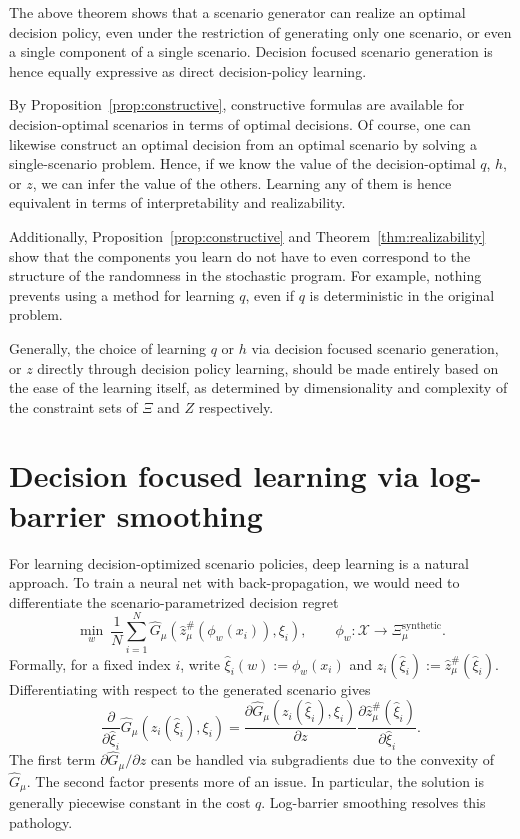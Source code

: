 \documentclass{article}
\newcommand{\1}{\mathbf{1}}
\theoremstyle{plain}
\theoremstyle{definition}
\theoremstyle{remark}
\begin{document}
The above theorem shows that a scenario generator can realize an optimal decision policy, even under the restriction of generating only one scenario, or even a single component of a single scenario. Decision focused scenario generation is hence equally expressive as direct decision-policy learning.

By Proposition~\ref{prop:constructive}, constructive formulas are available for decision-optimal scenarios in terms of optimal decisions. Of course, one can likewise construct an optimal decision from an optimal scenario by solving a single-scenario problem. Hence, if we know the value of the decision-optimal $q$, $h$, or $z$, we can infer the value of the others. Learning any of them is hence equivalent in terms of interpretability and realizability.

Additionally, Proposition~\ref{prop:constructive} and Theorem~\ref{thm:realizability} show that the components you learn do not have to even correspond to the structure of the randomness in the stochastic program. For example, nothing prevents using a method for learning $q$, even if $q$ is deterministic in the original problem.

Generally, the choice of learning $q$ or $h$ via decision focused scenario generation, or $z$ directly through decision policy learning, should be made entirely based on the ease of the learning itself, as determined by dimensionality and complexity of the constraint sets of $\Xi$ and $Z$ respectively.

\section{Decision focused learning via log-barrier smoothing}
\label{sec:dfl-logbarrier}
\label{sec:barrier}
\label{sec:backprop-logbarriers}

For learning decision-optimized scenario policies, deep learning is a natural approach.
To train a neural net with back-propagation, we would need to differentiate the scenario-parametrized decision regret
\begin{equation}
\label{eq:scenario-parametrized-erm}
\min_w\ \frac1N\sum_{i=1}^N
\hat G_\mu\!\left(\hat z_\mu^\#(\phi_w(x_i)),\xi_i\right),
\qquad
\phi_w:\mathcal X\to \Xi_\mu^{\mathrm{synthetic}}.
\end{equation}
Formally, for a fixed index $i$, write $\hat\xi_i(w):=\phi_w(x_i)$ and $z_i(\hat\xi_i):=\hat z_\mu^\#(\hat\xi_i)$.
Differentiating with respect to the generated scenario gives
\begin{equation}
\label{eq:scenario-chain-rule}
\frac{\partial}{\partial \hat\xi_i}\hat G_\mu(z_i(\hat\xi_i),\xi_i)
=
\frac{\partial \hat G_\mu(z_i(\hat\xi_i),\xi_i)}{\partial z}
\frac{\partial \hat z_\mu^\#(\hat\xi_i)}{\partial \hat\xi_i}.
\end{equation}
The first term $\partial \hat G_\mu/\partial z$ can be handled via subgradients due to the convexity of $\hat G_\mu$.
The second factor presents more of an issue. In particular, the solution is generally piecewise constant in the cost $q$. Log-barrier smoothing resolves this pathology.
\end{document}
